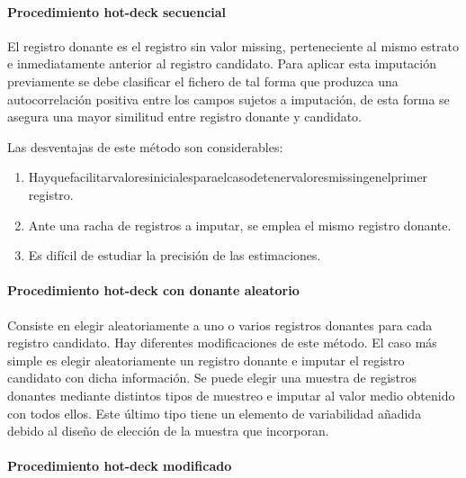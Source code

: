 \documentclass[
  openany]{book}
\begin{document}
\hypertarget{procedimiento-hot-deck-secuencial}{%
\paragraph{Procedimiento hot-deck secuencial}\label{procedimiento-hot-deck-secuencial}}

El registro donante es el registro sin valor missing, perteneciente al mismo estrato e inmediatamente anterior al registro candidato. Para aplicar esta imputación previamente se debe clasificar el fichero de tal forma que produzca una autocorrelación positiva entre los campos sujetos a imputación, de esta forma se asegura una mayor similitud entre registro donante y candidato.

Las desventajas de este método son considerables:

\begin{enumerate}
\def\labelenumi{\arabic{enumi}.}
\item
  Hayquefacilitarvaloresinicialesparaelcasodetenervaloresmissingenelprimer registro.
\item
  Ante una racha de registros a imputar, se emplea el mismo registro donante.
\item
  Es difícil de estudiar la precisión de las estimaciones.
\end{enumerate}

\hypertarget{procedimiento-hot-deck-con-donante-aleatorio}{%
\paragraph{Procedimiento hot-deck con donante aleatorio}\label{procedimiento-hot-deck-con-donante-aleatorio}}

Consiste en elegir aleatoriamente a uno o varios registros donantes para cada registro candidato. Hay diferentes modificaciones de este método. El caso más simple es elegir aleatoriamente un registro donante e imputar el registro candidato con dicha información. Se puede elegir una muestra de registros donantes mediante distintos tipos de muestreo e imputar al valor medio obtenido con todos ellos. Este último tipo tiene un elemento de variabilidad añadida debido al diseño de elección de la muestra que incorporan.

\hypertarget{procedimiento-hot-deck-modificado}{%
\paragraph{Procedimiento hot-deck modificado}\label{procedimiento-hot-deck-modificado}}
\end{document}
